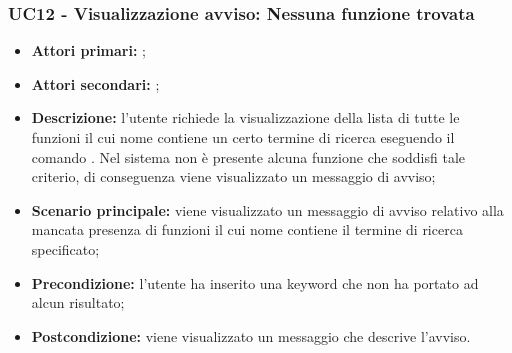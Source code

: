 \subsubsection{UC12 - Visualizzazione avviso: Nessuna funzione trovata}
\begin{itemize}
	\item \textbf{Attori primari:} \ua{};
	\item \textbf{Attori secondari:} \re{};
	\item \textbf{Descrizione:} l’utente richiede la visualizzazione della lista di tutte le funzioni il cui nome contiene un certo termine di ricerca eseguendo il comando \psearch{}. Nel sistema non è presente alcuna funzione che soddisfi tale criterio, di conseguenza viene visualizzato un messaggio di avviso;
	\item \textbf{Scenario principale:} viene visualizzato un messaggio di avviso relativo alla mancata presenza di funzioni il cui nome contiene il termine di ricerca specificato;
	\item \textbf{Precondizione:} l’utente ha inserito una keyword che non ha portato ad alcun risultato;
	\item \textbf{Postcondizione:} viene visualizzato un messaggio che descrive l'avviso.
\end{itemize}